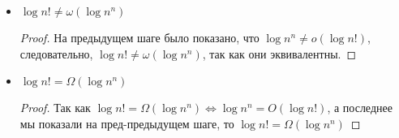 \begin{enumerate}
\begin{itemize}
\begin{proof}
        \end{proof}
        \item $\log n! \neq \omega(\log n^n)$
        \begin{proof}
            На предыдущем шаге было показано, что $\log n^n \neq o(\log n!)$, следовательно, $\log n! \neq \omega(\log n^n)$, так как они эквивалентны.
        \end{proof}
        \item $\log n! = \Omega(\log n^n)$
        \begin{proof}
            Так как $\log n! = \Omega(\log n^n) \Leftrightarrow \log n^n = O(\log n!)$, а последнее мы показали на пред-предыдущем шаге, то $\log n! = \Omega(\log n^n)$
        \end{proof}
    \end{itemize}
    
\end{enumerate}